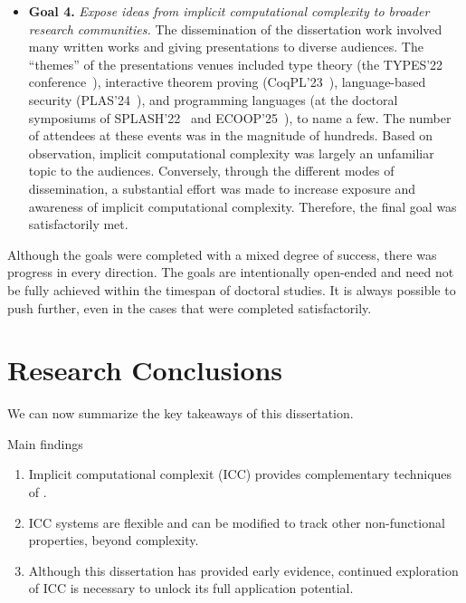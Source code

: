 \begin{itemize}
\item[\iconDONE]\textbf{Goal 4.}
\emph{Expose ideas from implicit computational complexity to broader research
communities.} The dissemination of the dissertation work involved many written
works and giving presentations to diverse audiences. The \enquote{themes} of the
presentations venues included type theory (the TYPES'22
conference~\cite{aubert202217}), interactive theorem proving
(CoqPL'23~\cite{aubert20231}), language-based security
(PLAS'24~\cite{plas2024}), and programming languages (at the doctoral
symposiums of SPLASH'22~\cite{splash22} and ECOOP'25~\cite{rusch20257}), to name
a few. The number of attendees at these events was in the magnitude of hundreds.
Based on observation, implicit computational complexity was largely an
unfamiliar topic to the audiences. Conversely, through the different modes of
dissemination, a substantial effort was made to increase exposure and awareness
of implicit computational complexity. Therefore, the final goal was
satisfactorily met.

\end{itemize}

Although the goals were completed with a mixed degree of success, there was
progress in every direction. The goals are intentionally open-ended and need not
be fully achieved within the timespan of doctoral studies. It is always possible
to push further, even in the cases that were completed satisfactorily.

\section{Research Conclusions}
\label{ssec:findings}

We can now summarize the key takeaways of this dissertation.

\begin{infobox}{Main findings}
\begin{enumerate}[wide, labelwidth=!, labelindent=0pt]

\item Implicit computational complexit (ICC) provides complementary
techniques of .

\item ICC systems are flexible and can be modified to track other
non-functional properties, beyond complexity. 

\item Although this dissertation has provided early evidence, continued
exploration of ICC is necessary to unlock its full application potential.

\end{enumerate}
\end{infobox}

